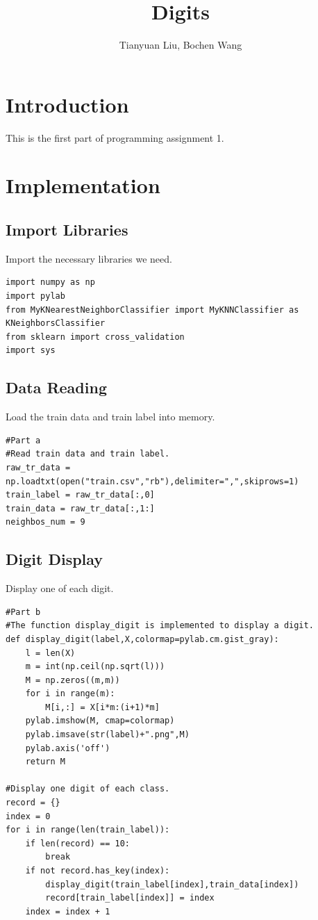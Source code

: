 \documentclass[a4paper]{article}
\begin{document}
\graphicspath{ {/Users/wangbochen/GitHub/ModernAnalysis/HW1/Digit/} }

\title{Digits}
\author{Tianyuan Liu, Bochen Wang}
\maketitle
\section*{Introduction}
This is the first part of programming assignment 1.
\section*{Implementation}
\subsection*{Import Libraries}
Import the necessary libraries we need.
\begin{lstlisting}
import numpy as np
import pylab
from MyKNearestNeighborClassifier import MyKNNClassifier as KNeighborsClassifier
from sklearn import cross_validation
import sys  
\end{lstlisting}
\subsection*{Data Reading}
Load the train data and train label into memory.
\begin{lstlisting}
#Part a
#Read train data and train label.
raw_tr_data = np.loadtxt(open("train.csv","rb"),delimiter=",",skiprows=1)
train_label = raw_tr_data[:,0]
train_data = raw_tr_data[:,1:]
neighbos_num = 9
\end{lstlisting}
\subsection*{Digit Display}
Display one of each digit.
\begin{lstlisting}
#Part b
#The function display_digit is implemented to display a digit.
def display_digit(label,X,colormap=pylab.cm.gist_gray):
    l = len(X)
    m = int(np.ceil(np.sqrt(l)))
    M = np.zeros((m,m)) 
    for i in range(m):
        M[i,:] = X[i*m:(i+1)*m]
    pylab.imshow(M, cmap=colormap)
    pylab.imsave(str(label)+".png",M)    
    pylab.axis('off')
    return M

#Display one digit of each class.
record = {}
index = 0
for i in range(len(train_label)):
    if len(record) == 10:
        break
    if not record.has_key(index):
        display_digit(train_label[index],train_data[index])
        record[train_label[index]] = index
    index = index + 1
\end{lstlisting}
\end{document}
